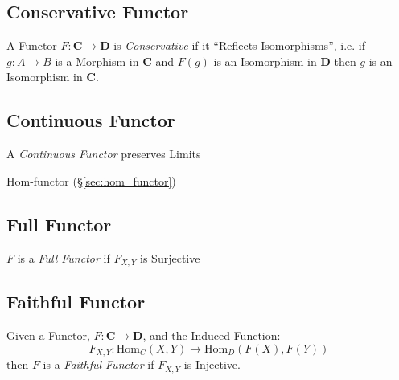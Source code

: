 \subsection{Conservative Functor}\label{sec:conservative_functor}

A Functor $F : \mathbf{C} \rightarrow \mathbf{D}$ is
\emph{Conservative} if it ``Reflects Isomorphisms'', i.e. if $g : A
\rightarrow B$ is a Morphism in $\mathbf{C}$ and $F(g)$ is an
Isomorphism in $\mathbf{D}$ then $g$ is an Isomorphism in
$\mathbf{C}$.



\subsection{Continuous Functor}\label{sec:continuous_functor}

A \emph{Continuous Functor} preserves Limits

Hom-functor (\S\ref{sec:hom_functor})



\subsection{Full Functor}\label{sec:full_functor}

$F$ is a \emph{Full Functor} if $F_{X,Y}$ is Surjective



\subsection{Faithful Functor}\label{sec:faithful_functor}

Given a Functor, $F : \mathbf{C} \rightarrow \mathbf{D}$, and the
Induced Function:
\[
  F_{X,Y} : \mathrm{Hom}_C(X,Y) \rightarrow \mathrm{Hom}_D(F(X),F(Y))
\]
then $F$ is a \emph{Faithful Functor} if $F_{X,Y}$ is Injective.




